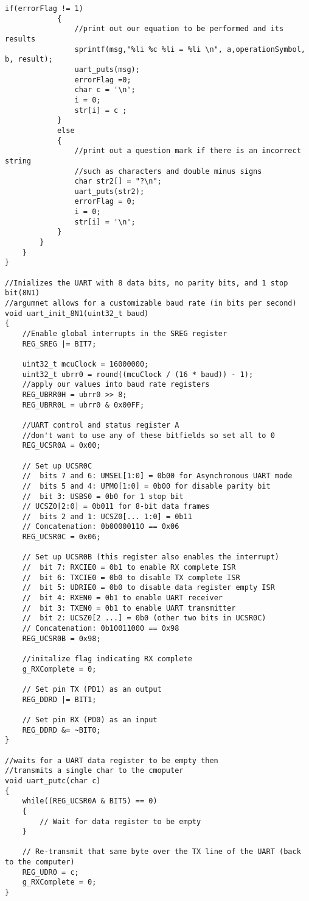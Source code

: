 \documentclass[11pt,pdftex,portrait,letterpaper]{article}
\begin{document}
\begin{lstlisting}[caption={Program 2}, label=l:programx]
			if(errorFlag != 1)
			{
				//print out our equation to be performed and its results
				sprintf(msg,"%li %c %li = %li \n", a,operationSymbol, b, result);
				uart_puts(msg);
				errorFlag =0;
				char c = '\n';
				i = 0;
				str[i] = c ;
			} 
			else
			{
				//print out a question mark if there is an incorrect string
				//such as characters and double minus signs
				char str2[] = "?\n";
				uart_puts(str2);
				errorFlag = 0;
				i = 0;
				str[i] = '\n';
			}
		}
	}
}

//Inializes the UART with 8 data bits, no parity bits, and 1 stop bit(8N1)
//argumnet allows for a customizable baud rate (in bits per second)
void uart_init_8N1(uint32_t baud)
{
	//Enable global interrupts in the SREG register
	REG_SREG |= BIT7;
	
	uint32_t mcuClock = 16000000;
	uint32_t ubrr0 = round((mcuClock / (16 * baud)) - 1);
	//apply our values into baud rate registers
	REG_UBRR0H = ubrr0 >> 8;
	REG_UBRR0L = ubrr0 & 0x00FF;
	
	//UART control and status register A
	//don't want to use any of these bitfields so set all to 0
	REG_UCSR0A = 0x00;
	
	// Set up UCSR0C
	//  bits 7 and 6: UMSEL[1:0] = 0b00 for Asynchronous UART mode
	//  bits 5 and 4: UPM0[1:0] = 0b00 for disable parity bit
	//  bit 3: USBS0 = 0b0 for 1 stop bit
	// UCSZ0[2:0] = 0b011 for 8-bit data frames
	//  bits 2 and 1: UCSZ0[... 1:0] = 0b11
	// Concatenation: 0b00000110 == 0x06
	REG_UCSR0C = 0x06;
	
	// Set up UCSR0B (this register also enables the interrupt)
	//  bit 7: RXCIE0 = 0b1 to enable RX complete ISR
	//  bit 6: TXCIE0 = 0b0 to disable TX complete ISR
	//  bit 5: UDRIE0 = 0b0 to disable data register empty ISR
	//  bit 4: RXEN0 = 0b1 to enable UART receiver
	//  bit 3: TXEN0 = 0b1 to enable UART transmitter
	//  bit 2: UCSZ0[2 ...] = 0b0 (other two bits in UCSR0C)
	// Concatenation: 0b10011000 == 0x98
	REG_UCSR0B = 0x98;
	
	//initalize flag indicating RX complete
	g_RXComplete = 0;
	
	// Set pin TX (PD1) as an output
	REG_DDRD |= BIT1;
	
	// Set pin RX (PD0) as an input
	REG_DDRD &= ~BIT0;
}

//waits for a UART data register to be empty then
//transmits a single char to the cmoputer
void uart_putc(char c)
{
	while((REG_UCSR0A & BIT5) == 0)
	{
		// Wait for data register to be empty
	}
	
	// Re-transmit that same byte over the TX line of the UART (back to the computer)
	REG_UDR0 = c;
	g_RXComplete = 0;
}


\end{lstlisting}
\end{document}
